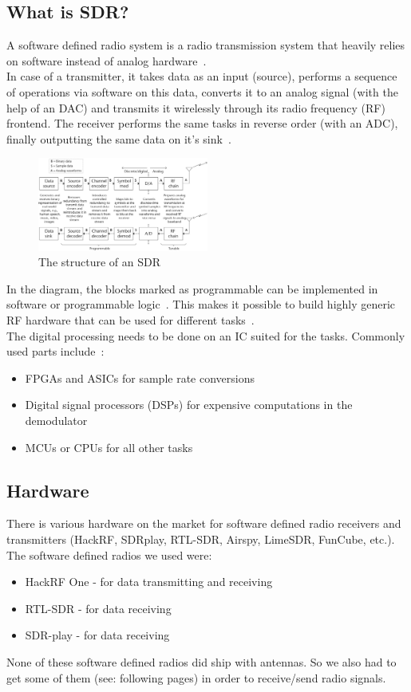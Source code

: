 \documentclass[conference]{IEEEtran}
\begin{document}
\subsection{What is SDR?}
A software defined radio system is a radio transmission system that heavily relies on software instead of analog hardware~\cite[1]{Heuberger2017}.\\
In case of a transmitter, it takes data as an input (source), performs a sequence of operations via software on this data, converts it to an analog signal (with the help of an DAC) and transmits it wirelessly through its radio frequency (RF) frontend. The receiver performs the same tasks in reverse order (with an ADC), finally outputting the same data on it's sink~\cite[5-6]{wyglinski2018software}.
\begin{figure}[H]
	\centering
	\includegraphics[width=0.5\textwidth]{forEngineers_SDR_structure}
	\caption{The structure of an SDR}
\end{figure}
In the diagram, the blocks marked as programmable can be implemented in software or programmable logic~\cite[5]{wyglinski2018software}. This makes it possible to build highly generic RF hardware that can be used for different tasks~\cite[4]{wyglinski2018software}.\\ 
The digital processing needs to be done on an IC suited for the tasks. Commonly used parts include~\cite[3]{Heuberger2017}:
\begin{itemize}
	\item FPGAs and ASICs for sample rate conversions
	\item Digital signal processors (DSPs) for expensive computations in the demodulator
	\item MCUs or CPUs for all other tasks
\end{itemize}

\subsection{Hardware}
There is various hardware on the market for software defined radio receivers and transmitters (HackRF, SDRplay, RTL-SDR, Airspy, LimeSDR, FunCube, etc.). The software defined radios we used were:
\begin{itemize}
	\item HackRF One - for data transmitting and receiving
	\item RTL-SDR - for data receiving
	\item SDR-play - for data receiving
\end{itemize}
\bigbreak
None of these software defined radios did ship with antennas. So we also had to get some of them (see: following pages) in order to receive/send radio signals.
\\
\end{document}
